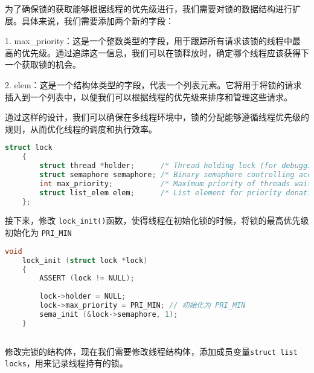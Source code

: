 \documentclass{article}
\begin{document}
	为了确保锁的获取能够根据线程的优先级进行，我们需要对锁的数据结构进行扩展。具体来说，我们需要添加两个新的字段：
	
	1. max\_priority：这是一个整数类型的字段，用于跟踪所有请求该锁的线程中最高的优先级。通过追踪这一信息，我们可以在锁释放时，确定哪个线程应该获得下一个获取锁的机会。
	
	2. elem：这是一个结构体类型的字段，代表一个列表元素。它将用于将锁的请求插入到一个列表中，以便我们可以根据线程的优先级来排序和管理这些请求。
	
	通过这样的设计，我们可以确保在多线程环境中，锁的分配能够遵循线程优先级的规则，从而优化线程的调度和执行效率。
	
	\begin{lstlisting}[language=C, title=修改后的锁结构体]
    struct lock 
    {
    	struct thread *holder;      /* Thread holding lock (for debugging). */
    	struct semaphore semaphore; /* Binary semaphore controlling access. */
    	int max_priority;           /* Maximum priority of threads waiting for lock. */
    	struct list_elem elem;      /* List element for priority donation. */
    };
	\end{lstlisting}
	
	接下来，修改 \texttt{lock\_init()}函数，使得线程在初始化锁的时候，将锁的最高优先级初始化为 \texttt{PRI\_MIN}
	
	\begin{lstlisting}[language=C, title=修改后的\texttt{lock\_init()}函数]
    void
    lock_init (struct lock *lock)
    {
    	ASSERT (lock != NULL);
    	
    	lock->holder = NULL;
    	lock->max_priority = PRI_MIN; // 初始化为 PRI_MIN
    	sema_init (&lock->semaphore, 1);
    }
		
	\end{lstlisting}
	
	修改完锁的结构体，现在我们需要修改线程结构体，添加成员变量\texttt{struct list locks}，用来记录线程持有的锁。
	
\end{document}
